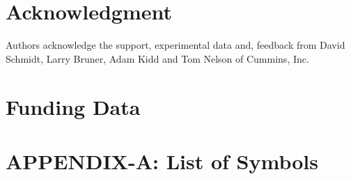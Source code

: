 \documentclass[subscriptcorrection,upint,varvw,barcolor=Goldenrod3,mathalfa=cal=euler,balance,hyphenate,french,pdf-a]{asmejour}
\begin{document}
\section*{Acknowledgment}
Authors acknowledge the support, experimental data and, feedback from David Schmidt, Larry
Bruner, Adam Kidd and Tom Nelson of Cummins, Inc.
\section*{Funding Data}
\appendix   %
\section{APPENDIX-A: List of Symbols}



\end{document}
